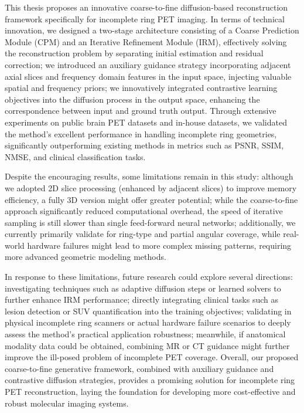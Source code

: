 \documentclass[
reprint,
superscriptaddress,
nofootinbib,
amsmath,amssymb,
aps,
prd,
]{revtex4-2}
\begin{document}
This thesis proposes an innovative coarse-to-fine diffusion-based reconstruction framework specifically for incomplete ring PET imaging. In terms of technical innovation, we designed a two-stage architecture consisting of a Coarse Prediction Module (CPM) and an Iterative Refinement Module (IRM), effectively solving the reconstruction problem by separating initial estimation and residual correction; we introduced an auxiliary guidance strategy incorporating adjacent axial slices and frequency domain features in the input space, injecting valuable spatial and frequency priors; we innovatively integrated contrastive learning objectives into the diffusion process in the output space, enhancing the correspondence between input and ground truth output. Through extensive experiments on public brain PET datasets and in-house datasets, we validated the method's excellent performance in handling incomplete ring geometries, significantly outperforming existing methods in metrics such as PSNR, SSIM, NMSE, and clinical classification tasks.

Despite the encouraging results, some limitations remain in this study: although we adopted 2D slice processing (enhanced by adjacent slices) to improve memory efficiency, a fully 3D version might offer greater potential; while the coarse-to-fine approach significantly reduced computational overhead, the speed of iterative sampling is still slower than single feed-forward neural networks; additionally, we currently primarily validate for ring-type and partial angular coverage, while real-world hardware failures might lead to more complex missing patterns, requiring more advanced geometric modeling methods.

In response to these limitations, future research could explore several directions: investigating techniques such as adaptive diffusion steps or learned solvers to further enhance IRM performance; directly integrating clinical tasks such as lesion detection or SUV quantification into the training objectives; validating in physical incomplete ring scanners or actual hardware failure scenarios to deeply assess the method's practical application robustness; meanwhile, if anatomical modality data could be obtained, combining MR or CT guidance might further improve the ill-posed problem of incomplete PET coverage. Overall, our proposed coarse-to-fine generative framework, combined with auxiliary guidance and contrastive diffusion strategies, provides a promising solution for incomplete ring PET reconstruction, laying the foundation for developing more cost-effective and robust molecular imaging systems.
\end{document}
